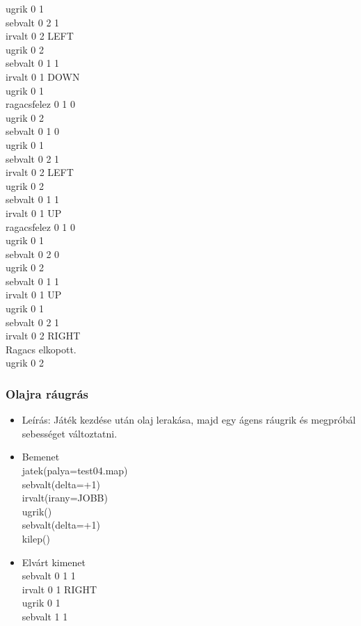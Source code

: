 \begin{itemize}
    ugrik 0 1 \\
    sebvalt 0 2 1 \\
    irvalt 0 2 LEFT \\
    ugrik 0 2 \\
    sebvalt 0 1 1 \\
    irvalt 0 1 DOWN \\
    ugrik 0 1 \\
    ragacsfelez 0 1 0 \\
    ugrik 0 2 \\
    sebvalt 0 1 0 \\
    ugrik 0 1 \\
    sebvalt 0 2 1 \\
    irvalt 0 2 LEFT \\
    ugrik 0 2 \\
    sebvalt 0 1 1 \\
    irvalt 0 1 UP \\
    ragacsfelez 0 1 0 \\
    ugrik 0 1 \\
    sebvalt 0 2 0 \\
    ugrik 0 2 \\
    sebvalt 0 1 1 \\
    irvalt 0 1 UP \\
    ugrik 0 1 \\
    sebvalt 0 2 1 \\
    irvalt 0 2 RIGHT \\
    Ragacs elkopott.\\ 
    ugrik 0 2\\
\end{itemize}

\subsubsection{Olajra ráugrás}
\begin{itemize}
	\item Leírás: Játék kezdése után olaj lerakása, majd egy ágens ráugrik és megpróbál sebességet változtatni. 
	\item Bemenet\\	
    jatek(palya=test04.map)\\
    sebvalt(delta=+1)\\
    irvalt(irany=JOBB)\\
    ugrik()\\
    sebvalt(delta=+1)\\
    kilep()\\
	\item Elvárt kimenet\\
    sebvalt 0 1 1 \\
    irvalt 0 1 RIGHT \\
    ugrik 0 1 \\
    sebvalt 1 1 \\
    

\end{itemize}

